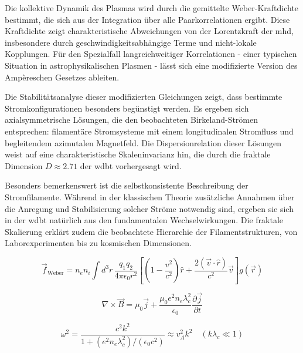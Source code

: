 Die kollektive Dynamik des Plasmas wird durch die gemittelte Weber-Kraftdichte bestimmt, die sich aus der Integration über alle Paarkorrelationen ergibt. Diese Kraftdichte zeigt
charakteristische Abweichungen von der Lorentzkraft der \gls{mhd}, insbesondere durch geschwindigkeitsabhängige Terme und nicht-lokale Kopplungen. Für den Spezialfall
langreichweitiger Korrelationen - einer typischen Situation in astrophysikalischen Plasmen - lässt sich eine modifizierte Version des Ampèreschen Gesetzes ableiten.

Die Stabilitätsanalyse dieser modifizierten Gleichungen zeigt, dass bestimmte Stromkonfigurationen besonders begünstigt werden. Es ergeben sich axialsymmetrische Lösungen, die
den beobachteten Birkeland-Strömen entsprechen: filamentäre Stromsysteme mit einem longitudinalen Stromfluss und begleitendem azimutalen Magnetfeld. Die Dispersionrelation dieser
Lösungen weist auf eine charakteristische Skaleninvarianz hin, die durch die fraktale Dimension $D \approx 2.71$ der \gls{wdbt} vorhergesagt wird.

Besonders bemerkenswert ist die selbstkonsistente Beschreibung der Stromfilamente. Während in der klassischen Theorie zusätzliche Annahmen über die Anregung und Stabilisierung
solcher Ströme notwendig sind, ergeben sie sich in der \gls{wdbt} natürlich aus den fundamentalen Wechselwirkungen. Die fraktale Skalierung erklärt zudem die beobachtete Hierarchie
der Filamentstrukturen, von Laborexperimenten bis zu kosmischen Dimensionen.

\begin{equation}
    \label{eq:force_density}
    \vec{f}_{\text{Weber}} = n_e n_i \int d^3r \, \frac{q_1 q_2}{4\pi\epsilon_0 r^2} \left[ \left(1 - \frac{v^2}{c^2}\right)\hat{r} + \frac{2(\vec{v}\cdot\hat{r})}{c^2}\vec{v} \right] g(\vec{r})
\end{equation}

\begin{equation}
    \label{eq:birkeland_ampere}
    \nabla \times \vec{B} = \mu_0 \vec{j} + \frac{\mu_0 e^2 n_e \lambda_c^2}{\epsilon_0} \frac{\partial \vec{j}}{\partial t}
\end{equation}

\begin{equation}
    \omega^2 = \frac{c^2 k^2}{1 + (e^2 n_e \lambda_c^2)/(\epsilon_0 c^2)} \approx v_A^2 k^2 \quad (k\lambda_c \ll 1)
\end{equation}


